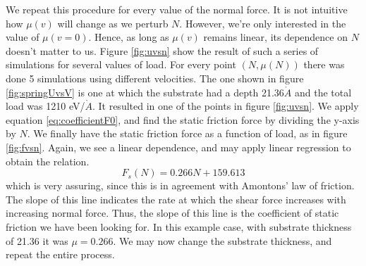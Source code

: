 \documentclass[twoside,english]{uiofysmaster}
\begin{document}
We repeat this procedure for every value of the normal force. 
It is not intuitive how $\mu(v)$ will change as we perturb $N$. 
However, we're only interested in the value of $\mu(v=0)$. 
Hence, as long as $\mu(v)$ remains linear, its dependence on $N$ doesn't matter to us. %
Figure \ref{fig:uvsn} show the result of such a series of simulations for several values of load. 
For every point $(N,\mu(N))$ there was done 5 simulations using different velocities. 
The one shown in figure \ref{fig:springUvsV} is one at which the substrate had a depth 21.36$\mathring{A}$ and the total load was 1210 eV/$\mathring{A}$. It resulted in one of the points in figure \ref{fig:uvsn}.
We apply equation \eqref{eq:coefficientF0}, and find the static friction force by dividing the y-axis by $N$. 
We finally have the static friction force as a function of load, as in figure \ref{fig:fvsn}.
Again, we see a linear dependence, and may apply linear regression to obtain the relation.
\begin{equation}
	F_s(N) = 0.266N + 159.613
\end{equation}
which is very assuring, since this is in agreement with Amontons' law of friction. 
The slope of this line indicates the rate at which the shear force increases with increasing normal force. 
Thus, the slope of this line is the coefficient of static friction we have been looking for.
In this example case, with substrate thickness of 21.36 it was $\mu = 0.266$.
We may now change the substrate thickness, and repeat the entire process.
\end{document}
